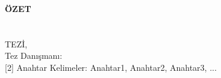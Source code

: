 \clearpage\pagebreak
\begin{center}
    \MakeUppercase{\textbf{Özet}} \\ [3\baselineskip]
    \MakeUppercase{\thesistitletr} \\ [3\baselineskip]
    \MakeUppercase{\student} \\[\baselineskip]
    \MakeUppercase{\majortr \degreetr Tez\.{ı}, \monthtr~\year} \\[\baselineskip]
    Tez Danışmanı: \advisortr \\
    [2\baselineskip]
    Anahtar Kelimeler: Anahtar1, Anahtar2, Anahtar3, ... \\[2\baselineskip]
\end{center}

\onehalfspacing

\lipsum[1]